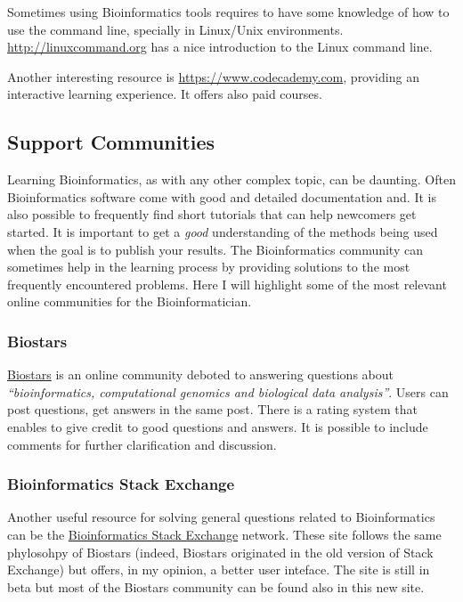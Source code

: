 \documentclass[]{book}
\theoremstyle{definition}
\theoremstyle{definition}
\theoremstyle{definition}
\theoremstyle{remark}
\begin{document}
Sometimes using Bioinformatics tools requires to have some knowledge of
how to use the command line, specially in Linux/Unix environments.
\href{http://linuxcommand.org/index.php}{http://linuxcommand.org} has a
nice introduction to the Linux command line.

Another interesting resource is \url{https://www.codecademy.com},
providing an interactive learning experience. It offers also paid
courses.

\subsection{Support Communities}\label{support-communities}

Learning Bioinformatics, as with any other complex topic, can be
daunting. Often Bioinformatics software come with good and detailed
documentation and. It is also possible to frequently find short
tutorials that can help newcomers get started. It is important to get a
\emph{good} understanding of the methods being used when the goal is to
publish your results. The Bioinformatics community can sometimes help in
the learning process by providing solutions to the most frequently
encountered problems. Here I will highlight some of the most relevant
online communities for the Bioinformatician.

\subsubsection*{Biostars}\label{biostars}

\href{http://biostars.org}{Biostars} is an online community deboted to
answering questions about \emph{``bioinformatics, computational genomics
and biological data analysis''}. Users can post questions, get answers
in the same post. There is a rating system that enables to give credit
to good questions and answers. It is possible to include comments for
further clarification and discussion.

\subsubsection*{Bioinformatics Stack
Exchange}\label{bioinformatics-stack-exchange}

Another useful resource for solving general questions related to
Bioinformatics can be the
\href{https://bioinformatics.stackexchange.com}{Bioinformatics Stack
Exchange} network. These site follows the same phylosohpy of Biostars
(indeed, Biostars originated in the old version of Stack Exchange) but
offers, in my opinion, a better user inteface. The site is still in beta
but most of the Biostars community can be found also in this new site.
\end{document}
